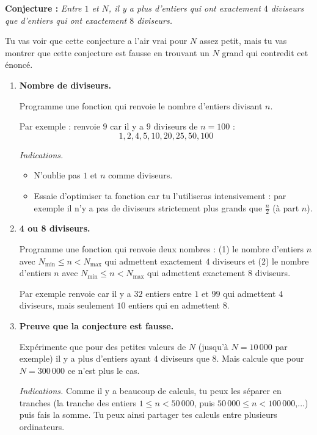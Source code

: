 \documentclass[11pt,class=report,crop=false]{standalone}
\begin{document}
\begin{activite}


\textbf{Conjecture :} \emph{Entre $1$ et $N$, il y a plus d'entiers qui ont exactement $4$ diviseurs que d'entiers qui ont exactement $8$ diviseurs.}

Tu vas voir que cette conjecture a l'air vrai pour $N$ assez petit, mais tu vas montrer que cette conjecture est fausse en trouvant un $N$ grand qui contredit cet énoncé.

\begin{enumerate}
  \item \textbf{Nombre de diviseurs.}
  
  Programme une fonction  qui renvoie le nombre d'entiers divisant $n$.
  
  Par exemple :  renvoie $9$ car il y a $9$ diviseurs de $n=100$ :
  $$1,2,4,5,10,20,25,50,100$$
  
  \emph{Indications.}
  \begin{itemize}
    \item N'oublie pas $1$ et $n$ comme diviseurs.
    \item Essaie d'optimiser ta fonction car tu l'utiliseras intensivement : par exemple il n'y a pas de diviseurs strictement plus grands que $\frac n2$ (à part $n$).    
   \end{itemize}
   
   
   \item \textbf{4 ou 8 diviseurs.}
   
   Programme une fonction  qui renvoie deux nombres : (1) le nombre d'entiers $n$ avec $N_{\text{min}} \le n < N_{\text{max}}$ qui admettent exactement $4$ diviseurs et (2) le nombre d'entiers $n$ avec $N_{\text{min}} \le n < N_{\text{max}}$ qui admettent exactement $8$ diviseurs.
   
   Par exemple  renvoie  car il y a $32$ entiers entre $1$ et $99$ qui admettent $4$ diviseurs, mais seulement $10$ entiers qui en admettent $8$.
   
   \item \textbf{Preuve que la conjecture est fausse.}
   
   Expérimente que pour des \og{}petites\fg{} valeurs de $N$ (jusqu'à $N = 10\,000$ par exemple) il y a plus d'entiers ayant $4$ diviseurs que $8$. Mais calcule que pour $N=300\,000$ ce n'est plus le cas.
   
   \emph{Indications.} Comme il y a beaucoup de calculs, tu peux les séparer en tranches (la tranche des entiers $1\le n < 50\,000$, puis $50\,000 \le n < 100\,000$,...) puis fais la somme.
   Tu peux ainsi partager tes calculs entre plusieurs ordinateurs.
   
\end{enumerate}   
     
\end{activite}
\end{document}
